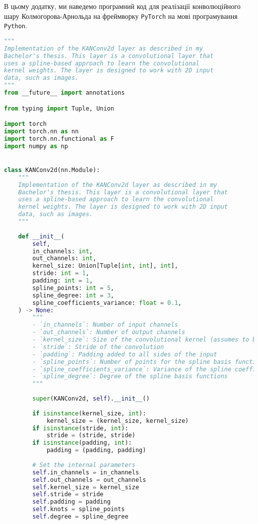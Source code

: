 В цьому додатку, ми наведемо програмний код для реалізації конволюційного шару
Колмогорова-Арнольда на фреймворку \texttt{PyTorch} на мові програмування
\texttt{Python}.
\begin{lstlisting}[language=Python]
"""
Implementation of the KANConv2d layer as described in my
Bachelor's thesis. This layer is a convolutional layer that
uses a spline-based approach to learn the convolutional
kernel weights. The layer is designed to work with 2D input
data, such as images.
"""
from __future__ import annotations

from typing import Tuple, Union

import torch
import torch.nn as nn
import torch.nn.functional as F
import numpy as np


class KANConv2d(nn.Module):
    """
    Implementation of the KANConv2d layer as described in my 
    Bachelor's thesis. This layer is a convolutional layer that
    uses a spline-based approach to learn the convolutional
    kernel weights. The layer is designed to work with 2D input
    data, such as images.
    """
    
    def __init__(
        self,
        in_channels: int, 
        out_channels: int, 
        kernel_size: Union[Tuple[int, int], int], 
        stride: int = 1,
        padding: int = 1,
        spline_points: int = 5, 
        spline_degree: int = 3,
        spline_coefficients_variance: float = 0.1,
    ) -> None:
        """
        - `in_channels`: Number of input channels
        - `out_channels`: Number of output channels
        - `kernel_size`: Size of the convolutional kernel (assumes to be square if of type `int`)
        - `stride`: Stride of the convolution
        - `padding`: Padding added to all sides of the input
        - `spline_points`: Number of points for the spline basis functions
        - `spline_coefficients_variance`: Variance of the spline coefficients initialization
        - `spline_degree`: Degree of the spline basis functions
        """
        
        super(KANConv2d, self).__init__()
        
        if isinstance(kernel_size, int):
            kernel_size = (kernel_size, kernel_size)
        if isinstance(stride, int):
            stride = (stride, stride)
        if isinstance(padding, int):
            padding = (padding, padding)
        
        # Set the internal parameters
        self.in_channels = in_channels
        self.out_channels = out_channels
        self.kernel_size = kernel_size
        self.stride = stride
        self.padding = padding
        self.knots = spline_points
        self.degree = spline_degree
        

\end{lstlisting}
